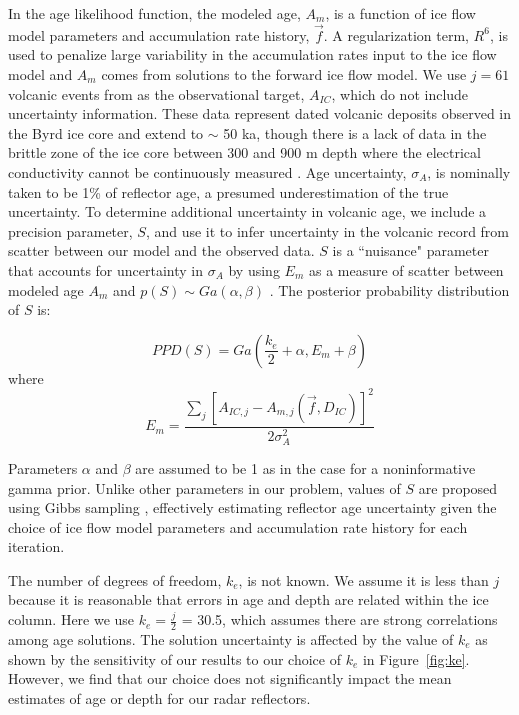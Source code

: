 In the age likelihood function, the modeled age, $A_m$, is a function of ice flow model parameters and accumulation rate history, $\vec{f}$. A regularization term, $R^6$, is used to penalize large variability in the accumulation rates input to the ice flow model and $A_m$ comes from solutions to the forward ice flow model. We use $j=61$ volcanic events from \citet{hammer1997} as the observational target, $A_{IC}$, which do not include uncertainty information. These data represent dated volcanic deposits observed in the Byrd ice core and extend to $\sim$ 50 ka, though there is a lack of data in the brittle zone of the ice core between 300 and 900 m depth where the electrical conductivity cannot be continuously measured \citep{hammer1997}. Age uncertainty, $\sigma_A$, is nominally taken to be 1\% of reflector age, a presumed underestimation of the true uncertainty. To determine additional uncertainty in volcanic age, we include a precision parameter, $S$, and use it to infer uncertainty in the volcanic record from scatter between our model and the observed data. $S$ is a ``nuisance" parameter that accounts for uncertainty in $\sigma_A$ by using $E_m$ as a measure of scatter between modeled age $A_m$ and $p(S) \sim Ga(\alpha,\beta)$ \citep{jackson&huerta2016}. The posterior probability distribution of $S$ is:

\begin{equation}\label{eqn:S}
PPD(S) = Ga(\frac{k_e}{2}+\alpha, E_m+\beta)
\end{equation}
where 
\begin{equation}
 E_m= \frac{\sum_{j}[A_{IC,j} - A_{m,j}(\vec{f},D_{IC})]^2}{2\sigma_A^2} 
\end{equation}

Parameters $\alpha$ and $\beta$ are assumed to be 1 as in the case for a noninformative gamma prior. Unlike other parameters in our problem, values of $S$ are proposed using Gibbs sampling \citep{gelfand1992}, effectively estimating reflector age uncertainty given the choice of ice flow model parameters and accumulation rate history for each iteration.

The number of degrees of freedom, $k_e$, is not known. We assume it is less than $j$ because it is reasonable that errors in age and depth are related within the ice column. Here we use $k_e = \frac{j}{2}$ = 30.5, which assumes there are strong correlations among age solutions. The solution uncertainty is affected by the value of $k_e$ as shown by the sensitivity of our results to our choice of $k_e$ in Figure~\ref{fig:ke}. However, we find that our choice does not significantly impact the mean estimates of age or depth for our radar reflectors. %

